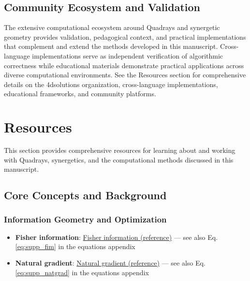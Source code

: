 \documentclass[
  10pt,
]{article}
\providecommand{\tightlist}{%
  \setlength{\itemsep}{0pt}\setlength{\parskip}{0pt}}
\begin{document}
\hypertarget{community-ecosystem-and-validation}{%
\subsection{Community Ecosystem and
Validation}\label{community-ecosystem-and-validation}}

The extensive computational ecosystem around Quadrays and synergetic
geometry provides validation, pedagogical context, and practical
implementations that complement and extend the methods developed in this
manuscript. Cross-language implementations serve as independent
verification of algorithmic correctness while educational materials
demonstrate practical applications across diverse computational
environments. See the Resources section for comprehensive details on the
4dsolutions organization, cross-language implementations, educational
frameworks, and community platforms. 

\hypertarget{resources}{%
\section{Resources}\label{resources}}

This section provides comprehensive resources for learning about and
working with Quadrays, synergetics, and the computational methods
discussed in this manuscript.

\hypertarget{core-concepts-and-background}{%
\subsection{Core Concepts and
Background}\label{core-concepts-and-background}}

\hypertarget{information-geometry-and-optimization}{%
\subsubsection{Information Geometry and
Optimization}\label{information-geometry-and-optimization}}

\begin{itemize}
\tightlist
\item
  \textbf{Fisher information}:
  \href{https://en.wikipedia.org/wiki/Fisher_information}{Fisher
  information (reference)} --- see also Eq. \eqref{eq:supp_fim} in the
  equations appendix
\item
  \textbf{Natural gradient}:
  \href{https://en.wikipedia.org/wiki/Natural_gradient}{Natural gradient
  (reference)} --- see also Eq. \eqref{eq:supp_natgrad} in the equations
  appendix
\end{itemize}
\end{document}
